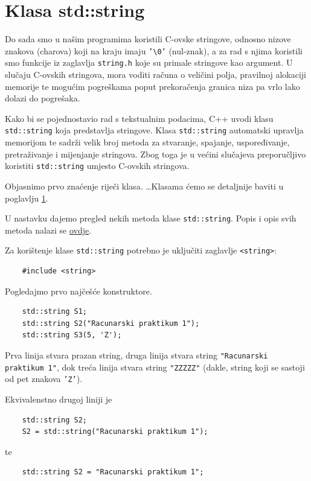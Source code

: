 \chapter{Klasa std::string}
Do sada smo u našim programima koristili C-ovske stringove, odnosno nizove znakova (charova) koji na kraju imaju \texttt{'\textbackslash 0'} (nul-znak), a za rad s njima koristili smo funkcije iz zaglavlja \texttt{string.h} koje su primale stringove kao argument. 
U slučaju C-ovskih stringova, mora voditi računa o veličini polja, pravilnoj alokaciji memorije te mogućim pogreškama poput prekoračenja granica niza pa vrlo lako dolazi do pogrešaka. 

Kako bi se pojednostavio rad s tekstualnim podacima, C++ uvodi klasu \texttt{std::string} koja predstavlja stringove. Klasa \texttt{std::string} automatski upravlja memorijom te sadrži velik broj metoda za stvaranje, spajanje, uspoređivanje, pretraživanje i mijenjanje stringova. Zbog toga je u većini slučajeva preporučljivo koristiti \texttt{std::string} umjesto C-ovskih stringova.

Objasnimo prvo znaćenje riječi klasa. \dots Klasama ćemo se detaljnije baviti u poglavlju \ref{}.

U nastavku dajemo pregled nekih metoda klase \texttt{std::string}. Popis i opis svih metoda nalazi se \href{https://cplusplus.com/reference/string/string/}{ovdje}.

Za korištenje klase \texttt{std::string} potrebno je uključiti zaglavlje \texttt{<string>}:
\begin{verbatim}
    #include <string>
\end{verbatim}

Pogledajmo prvo najčešće konstruktore.
\begin{verbatim}
    std::string S1;
    std::string S2("Racunarski praktikum 1");
    std::string S3(5, 'Z');
\end{verbatim}
Prva linija stvara prazan string, druga linija stvara string \texttt{"Racunarski praktikum 1"}, dok treća linija stvara string \texttt{"ZZZZZ"} (dakle, string koji se sastoji od pet znakova \texttt{'Z'}).

Ekvivalenstno drugoj liniji je 
\begin{verbatim}
    std::string S2;
    S2 = std::string("Racunarski praktikum 1");
\end{verbatim}
te
\begin{verbatim}
    std::string S2 = "Racunarski praktikum 1";
\end{verbatim}

